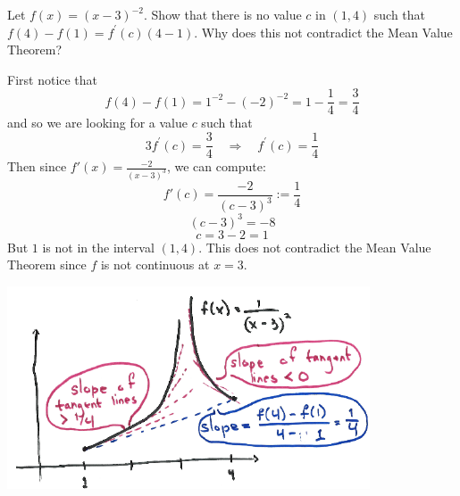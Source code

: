 \documentclass[nooutcomes]{ximera}
\begin{document}
\begin{problem}
  Let $f(x) = (x-3)^{-2}$.
  Show that there is no value $c$ in $(1,4)$ such that $f(4) - f(1) = f^{\prime}(c) (4-1)$.
  Why does this not contradict the Mean Value Theorem?
  \begin{freeResponse}
    First notice that 
    $$f(4)-f(1) = 1^{-2} - (-2)^{-2} = 1-\frac{1}{4} = \frac{3}{4}$$
    and so we are looking for a value $c$ such that 
    $$3 f^\prime (c) = \frac{3}{4} \quad \Longrightarrow \quad f^\prime (c) = \frac{1}{4} $$
    Then since $f'(x) = \frac{-2}{(x-3)^3}$, we can compute:
    $$ f'(c) = \frac{-2}{(c-3)^3} := \frac{1}{4}$$
    $$ (c-3)^3 = - 8 $$
    $$ c = 3 - 2 = 1 $$
    But $1$ is not in the interval $(1,4)$.  This does not contradict the Mean Value Theorem since $f$ is not continuous at $x=3$.

    \begin{image}
      \includegraphics[scale=.7]{Images/Figure5.png}
    \end{image}
  \end{freeResponse}
\end{problem}
\end{document}

